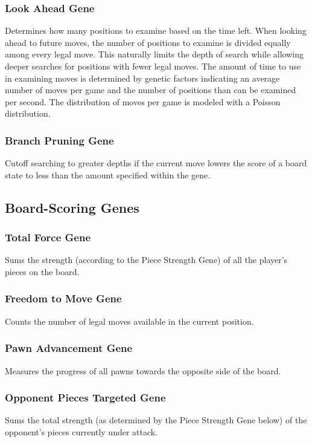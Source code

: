 \documentclass[letter]{article}
\renewcommand\_{\textunderscore\allowbreak}
\begin{document}
\subsubsection{Look Ahead Gene}
Determines how many positions to examine based on the time left. When looking ahead to future moves, the number of positions to examine is divided equally among every legal move. This naturally limits the depth of search while allowing deeper searches for positions with fewer legal moves. The amount of time to use in examining moves is determined by genetic factors indicating an average number of moves per game and the number of positions than can be examined per second. The distribution of moves per game is modeled with a Poisson distribution.

\subsubsection{Branch Pruning Gene}
Cutoff searching to greater depths if the current move lowers the score of a board state to less than the amount specified within the gene.

\subsection{Board-Scoring Genes}
\subsubsection{Total Force Gene}
Sums the strength (according to the Piece Strength Gene) of all the player's pieces on the board.

\subsubsection{Freedom to Move Gene}
Counts the number of legal moves available in the current position.

\subsubsection{Pawn Advancement Gene}
Measures the progress of all pawns towards the opposite side of the board.

\subsubsection{Opponent Pieces Targeted Gene}
Sums the total strength (as determined by the Piece Strength Gene below) of the opponent's pieces currently under attack.
\end{document}
